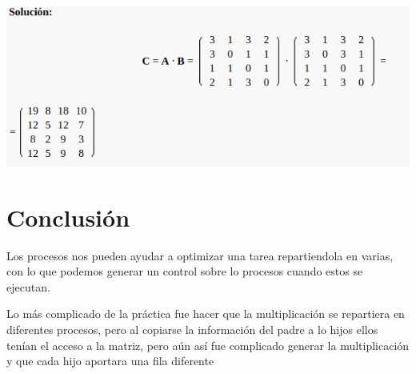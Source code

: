 \documentclass[10pt,a4paper]{article}
\begin{document}
\begin{flushleft}
	\includegraphics[scale=0.5]{screen1.png} 
\end{flushleft}

\section{Conclusión}

\begin{flushleft}
Los procesos nos pueden ayudar a optimizar una tarea repartiendola en varias, con lo que podemos generar un control sobre lo procesos cuando estos se ejecutan.
\end{flushleft}

\begin{flushleft}
Lo más complicado de la práctica fue hacer que la multiplicación se repartiera en diferentes procesos, pero al copiarse la información del padre a lo hijos ellos tenían el acceso a la matriz, pero aún así fue complicado generar la multiplicación y que cada hijo aportara una fila diferente
\end{flushleft}
\end{document}
